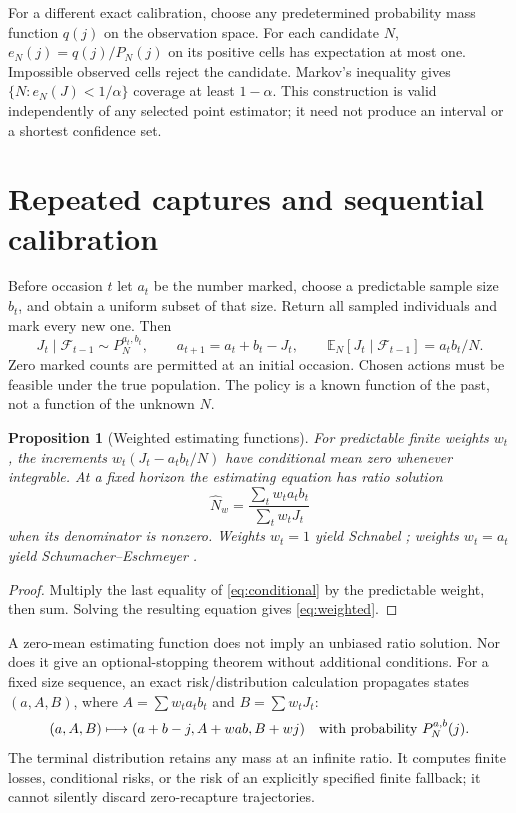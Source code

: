 \documentclass[11pt]{article}
\newtheorem{proposition}[theorem]{Proposition}
\theoremstyle{remark}\newtheorem{remark}[theorem]{Remark}
\newcommand{\E}{\mathbb E}\newcommand{\PP}{\mathbb P}
\begin{document}
For a different exact calibration, choose any predetermined probability
mass function $q(j)$ on the observation space. For each candidate $N$,
$e_N(j)=q(j)/P_N(j)$ on its positive cells has expectation at most one.
Impossible observed cells reject the candidate. Markov's inequality gives
$\{N:e_N(J)<1/\alpha\}$ coverage at least $1-\alpha$.
This construction is valid independently of any selected point estimator;
it need not produce an interval or a shortest confidence set.

\section{Repeated captures and sequential calibration}
Before occasion $t$ let $a_t$ be the number marked, choose a predictable
sample size $b_t$, and obtain a uniform subset of that size. Return all
sampled individuals and mark every new one. Then
\begin{equation}\label{eq:conditional}
 J_t\mid\mathcal F_{t-1}\sim P_N^{a_t,b_t},\qquad
 a_{t+1}=a_t+b_t-J_t,\qquad
 \E_N[J_t\mid\mathcal F_{t-1}]=a_tb_t/N.
\end{equation}
Zero marked counts are permitted at an initial occasion. Chosen actions
must be feasible under the true population. The policy is a known function
of the past, not a function of the unknown $N$.

\begin{proposition}[Weighted estimating functions]\label{prop:weighted}
For predictable finite weights $w_t$, the increments
$w_t(J_t-a_tb_t/N)$ have conditional mean zero whenever integrable.
At a fixed horizon the estimating equation has ratio solution
\begin{equation}\label{eq:weighted}
 \widehat N_w=\frac{\sum_t w_ta_tb_t}{\sum_t w_tJ_t}
\end{equation}
when its denominator is nonzero. Weights $w_t=1$ yield Schnabel
\cite{Schnabel1938}; weights $w_t=a_t$ yield Schumacher--Eschmeyer
\cite{Schumacher1943,Dettloff2023}.
\end{proposition}
\begin{proof}
Multiply the last equality of \eqref{eq:conditional} by the predictable
weight, then sum. Solving the resulting equation gives \eqref{eq:weighted}.
\end{proof}
A zero-mean estimating function does not imply an unbiased ratio solution.
Nor does it give an optional-stopping theorem without additional conditions.
For a fixed size sequence, an exact risk/distribution calculation propagates
states $(a,A,B)$, where $A=\sum w_ta_tb_t$ and $B=\sum w_tJ_t$:
\[
 (a,A,B)\longmapsto(a+b-j,A+wab,B+wj)
 \quad\hbox{with probability }P_N^{a,b}(j).
\]
The terminal distribution retains any mass at an infinite ratio. It computes
finite losses, conditional risks, or the risk of an explicitly specified
finite fallback; it cannot silently discard zero-recapture trajectories.
\end{document}
